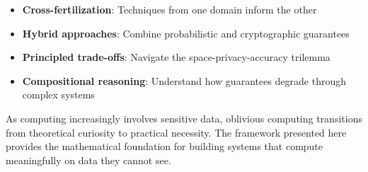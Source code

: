 \documentclass[11pt,final,hidelinks]{article}
\begin{document}
\begin{itemize}
    \item \textbf{Cross-fertilization}: Techniques from one domain inform the other
    \item \textbf{Hybrid approaches}: Combine probabilistic and cryptographic guarantees
    \item \textbf{Principled trade-offs}: Navigate the space-privacy-accuracy trilemma
    \item \textbf{Compositional reasoning}: Understand how guarantees degrade through complex systems
\end{itemize}

As computing increasingly involves sensitive data, oblivious computing transitions from theoretical curiosity to practical necessity. The framework presented here provides the mathematical foundation for building systems that compute meaningfully on data they cannot see.


\end{document}
